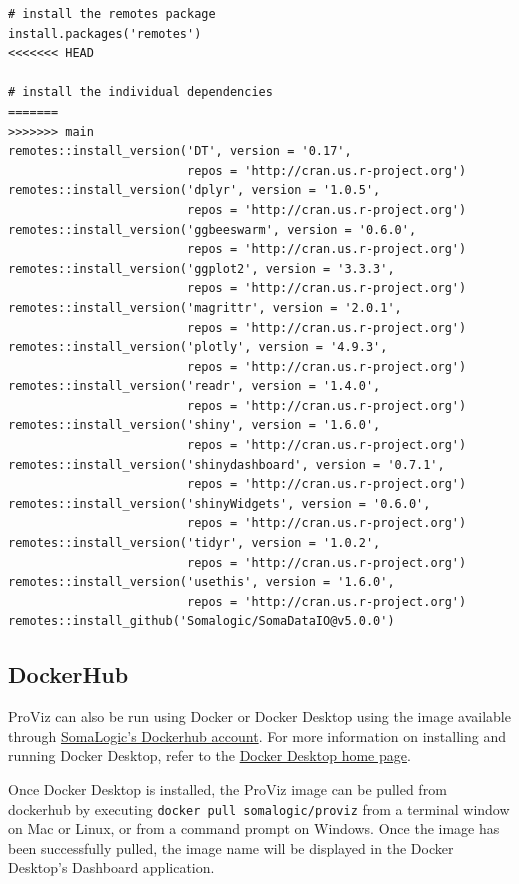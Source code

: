 \documentclass[
]{book}
\begin{document}
\begin{verbatim}
# install the remotes package 
install.packages('remotes')
<<<<<<< HEAD

# install the individual dependencies
=======
>>>>>>> main
remotes::install_version('DT', version = '0.17', 
                         repos = 'http://cran.us.r-project.org')
remotes::install_version('dplyr', version = '1.0.5',
                         repos = 'http://cran.us.r-project.org')
remotes::install_version('ggbeeswarm', version = '0.6.0',
                         repos = 'http://cran.us.r-project.org')
remotes::install_version('ggplot2', version = '3.3.3',
                         repos = 'http://cran.us.r-project.org')
remotes::install_version('magrittr', version = '2.0.1',
                         repos = 'http://cran.us.r-project.org')
remotes::install_version('plotly', version = '4.9.3',
                         repos = 'http://cran.us.r-project.org')
remotes::install_version('readr', version = '1.4.0',
                         repos = 'http://cran.us.r-project.org')
remotes::install_version('shiny', version = '1.6.0',
                         repos = 'http://cran.us.r-project.org')
remotes::install_version('shinydashboard', version = '0.7.1',
                         repos = 'http://cran.us.r-project.org')
remotes::install_version('shinyWidgets', version = '0.6.0',
                         repos = 'http://cran.us.r-project.org')
remotes::install_version('tidyr', version = '1.0.2',
                         repos = 'http://cran.us.r-project.org')
remotes::install_version('usethis', version = '1.6.0',
                         repos = 'http://cran.us.r-project.org')
remotes::install_github('Somalogic/SomaDataIO@v5.0.0')
\end{verbatim}

\hypertarget{dockerhub}{%
\subsection{DockerHub}\label{dockerhub}}

ProViz can also be run using Docker or Docker Desktop using the image available through \href{https://hub.docker.com/r/somalogic/proviz}{SomaLogic's Dockerhub account}. For more information on installing and running Docker Desktop, refer to the \href{https://www.docker.com/products/docker-desktop}{Docker Desktop home page}.

Once Docker Desktop is installed, the ProViz image can be pulled from dockerhub by executing \texttt{docker\ pull\ somalogic/proviz} from a terminal window on Mac or Linux, or from a command prompt on Windows. Once the image has been successfully pulled, the image name will be displayed in the Docker Desktop's Dashboard application.
\end{document}
